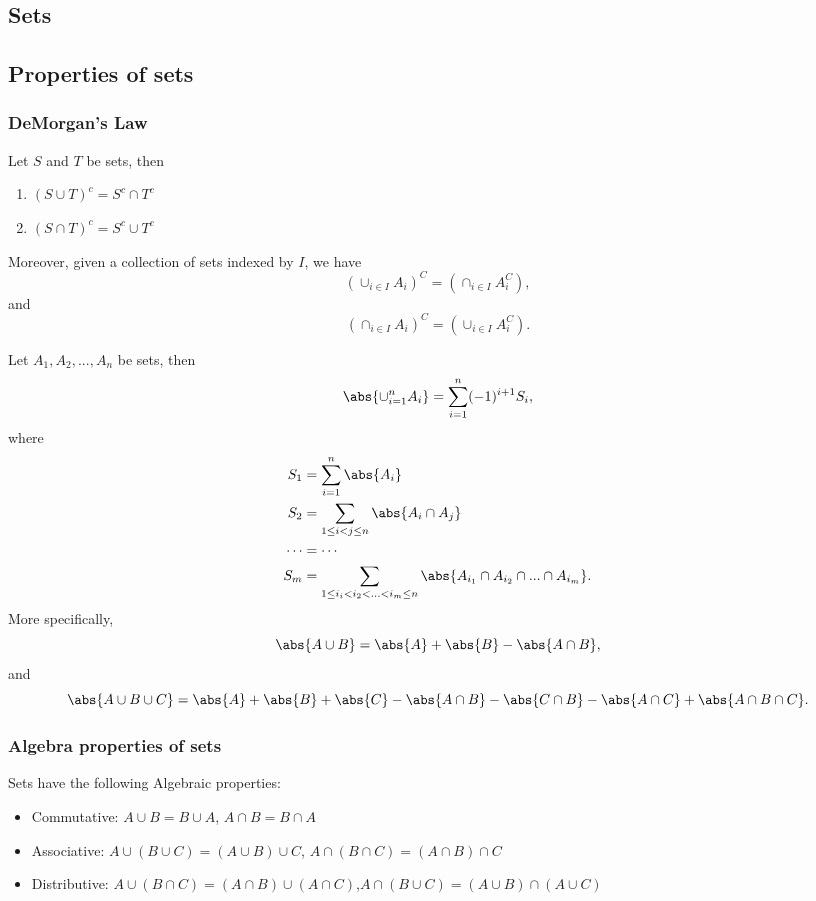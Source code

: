 \startcontents[chapters]
\begin{refsection}
\chapter{Sets}\label{ch:sets}

\section{Properties of sets}
\subsection{DeMorgan's Law}
\begin{lemma}\label{ch:sets:th:DemorganLaw}
\cite{johnsonbaugh2010foundations}Let $S$ and $T$ be sets, then
\begin{enumerate}
    \item $(S\cup T)^c = S^c \cap T^c$
    \item $(S\cap T)^c = S^c \cup T^c$
\end{enumerate}
Moreover, given a collection of sets indexed by $I$, we have
$$(\cup_{i\in I} A_i)^C = (\cap_{i\in I} A_i^C),$$ and $$(\cap_{i\in I} A_i)^C = (\cup_{i\in I} A_i^C).$$ 
\end{lemma}


\begin{lemma}
Let $A_1,A_2,...,A_n$ be sets, then
$$\abs{\cup_{i=1}^n A_i} = \sum_{i=1}^n (-1)^{i+1}S_i,$$
where
\begin{align*}
S_1 &= \sum_{i=1}^n \abs{A_i}\\
S_2 &= \sum_{1\leq i < j \leq n} \abs{A_i\cap A_j}\\
\cdots & = \cdots \\
S_m &= \sum_{1\leq i_i < i_2 < ... <i_m \leq n} \abs{A_{i_1}\cap A_{i_2}\cap ... \cap A_{i_m}}.
\end{align*}
More specifically, 
$$\abs{A\cup B} = \abs{A} + \abs{B} - \abs{A\cap B},$$
and
$$\abs{A\cup B\cup C} = \abs{A} + \abs{B} + \abs{C}- \abs{A\cap B}-\abs{C\cap B}-\abs{A\cap C}+\abs{A\cap B\cap C}.$$
\end{lemma}


\subsection{Algebra properties of sets}
\begin{lemma}
Sets have the following Algebraic properties:
\begin{itemize}
    \item Commutative: $A\cup B = B\cup A$, $A\cap B = B\cap A$
    \item Associative: $A \cup (B \cup C) = (A \cup B) \cup C$, $A \cap (B \cap C) = (A \cap B) \cap C$
    \item Distributive: $A\cup (B\cap C) = (A\cap B) \cup (A \cap C)$,$A\cap (B\cup C) = (A\cup B) \cap (A \cup C)$
\end{itemize}
\end{lemma}



\end{refsection}
